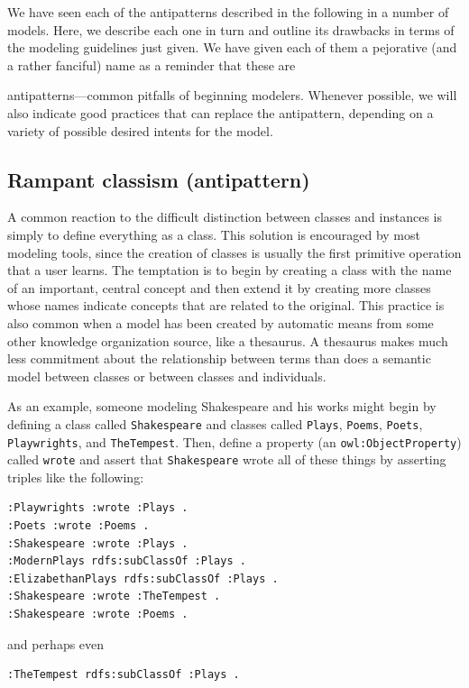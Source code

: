 We have seen each of the antipatterns described in the following in a
number of models. Here, we describe each one in turn and outline its
drawbacks in terms of the modeling guidelines just given. We have given
each of them a pejorative (and a rather fanciful) name as a reminder
that these are

antipatterns---common pitfalls of beginning modelers. Whenever possible,
we will also indicate good practices that can replace the antipattern,
depending on a variety of possible desired intents for the model.

\subsection{Rampant classism (antipattern)}

A common reaction to the difficult distinction between classes and
instances is simply to define everything as a class. This solution is
encouraged by most modeling tools, since the creation of classes is
usually the first primitive operation that a user learns. The temptation
is to begin by creating a class with the name of an important, central
concept and then extend it by creating more classes whose names indicate
concepts that are related to the original. This practice is also common
when a model has been created by automatic means from some other
knowledge organization source, like a thesaurus. A thesaurus makes much
less commitment about the relationship between terms than does a
semantic model between classes or between classes and individuals.

As an example, someone modeling Shakespeare and his works might begin by
defining a class called \texttt{Shakespeare} and classes called \texttt{Plays}, \texttt{Poems},
\texttt{Poets}, \texttt{Playwrights}, and \texttt{TheTempest}. Then, define a property (an
\texttt{owl:ObjectProperty}) called \texttt{wrote} and assert that \texttt{Shakespeare} wrote all
of these things by asserting triples like the following:

\begin{lstlisting}
:Playwrights :wrote :Plays .
:Poets :wrote :Poems .
:Shakespeare :wrote :Plays .
:ModernPlays rdfs:subClassOf :Plays .
:ElizabethanPlays rdfs:subClassOf :Plays .
:Shakespeare :wrote :TheTempest . 
:Shakespeare :wrote :Poems .
\end{lstlisting}

and perhaps even

\begin{lstlisting}
:TheTempest rdfs:subClassOf :Plays .
\end{lstlisting}

